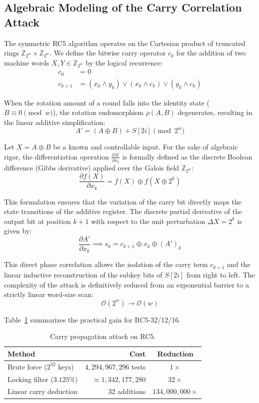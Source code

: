 \documentclass[12pt,a4paper]{article}
\theoremstyle{plain}
\begin{document}
\subsection{Algebraic Modeling of the Carry Correlation Attack}

The symmetric RC5 algorithm operates on the Cartesian product of
truncated rings $\mathbb{Z}_{2^w} \times \mathbb{Z}_{2^w}$. We define
the bitwise carry operator $c_k$ for the addition of two machine
words $X, Y \in \mathbb{Z}_{2^w}$ by the logical recurrence:
\begin{align*}
c_0 &= 0 \\
c_{k+1} &= (x_k \wedge y_k) \vee (x_k \wedge c_k) \vee (y_k \wedge c_k)
\end{align*}

When the rotation amount of a round falls into the identity state
($B \equiv 0 \pmod w$), the rotation endomorphism $\rho(A, B)$
degenerates, resulting in the linear additive simplification:
\[
A' = (A \oplus B) + S[2i] \pmod{2^w}
\]

Let $X = A \oplus B$ be a known and controllable input. For the
sake of algebraic rigor, the differentiation operation
$\frac{\partial A'}{\partial x_k}$ is formally defined as the
discrete Boolean difference (Gibbs derivative) applied over the
Galois field $\mathbb{Z}_{2^w}$:
\[
\frac{\partial f(X)}{\partial x_k} = f(X) \oplus f(X \oplus 2^k)
\]

This formulation ensures that the variation of the carry bit
directly maps the state transitions of the additive register. The
discrete partial derivative of the output bit at position $k+1$ with
respect to the unit perturbation $\Delta X = 2^k$ is given by:
\[
\frac{\partial A'}{\partial x_k} \implies
s_k = c_{k+1} \oplus x_k \oplus (A')_k
\]

This direct phase correlation allows the isolation of the carry term
$c_{k+1}$ and the linear inductive reconstruction of the subkey bits of
$S[2i]$ from right to left. The complexity of the attack is
definitively reduced from an exponential barrier to a strictly linear
word-size scan:
\[
\mathcal{O}(2^w) \longrightarrow \mathcal{O}(w)
\]

Table~\ref{tab:carry} summarizes the practical gain for RC5-32/12/16.

\begin{table}[htbp]
\centering
\caption{Carry propagation attack on RC5.}
\label{tab:carry}
\begin{tabular}{lrc}
\hline
Method & Cost & Reduction \\
\hline
Brute force ($2^{32}$ keys) & $4,294,967,296$ tests & $1\times$ \\
Locking filter ($3.125\%$) & $\approx 1,342,177,280$ & $32\times$ \\
Linear carry deduction & $32$ additions & $134,000,000\times$ \\
\hline
\end{tabular}
\end{table}
\end{document}
